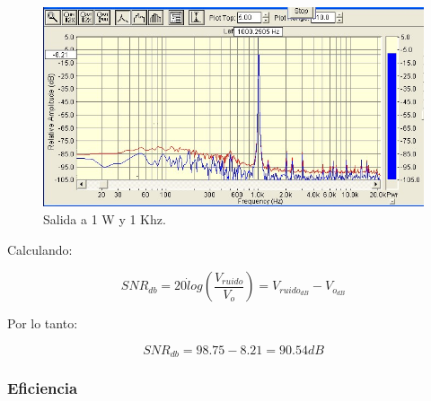 			\begin{figure}[H]
				\centering
				\includegraphics[scale=0.6]{./Figuras/SNR_1K_1W_imagen2.jpg}
			\caption{Salida a 1 W y 1 Khz.}
			\end{figure}


			Calculando:

			\begin{equation*}
			SNR_{db}  = 20 \dot log(\frac{V_{ruido}}{V_o}) = V_{ruido_{dB}} - V_{o_{dB}}
			\end{equation*}

			Por lo tanto: 

			\begin{equation*}
			SNR_{db}  = 98.75 - 8.21 = 90.54 dB  
			\end{equation*}

			\subsubsection{Eficiencia}


%		
%
%
